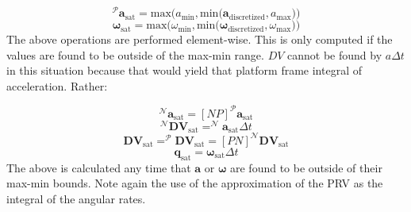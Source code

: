 \begin{equation}
	^\mathcal{P}\bm{a}_{\mathrm{sat}} = \mathrm{max}\big(a_{\mathrm{min}}, \mathrm{min}\big(    \bm{a}_{\mathrm{discretized}}, a_{\mathrm{max}}    \big)   \big)
\end{equation}
\begin{equation}
\bm{\omega}_{\mathrm{sat}} = \mathrm{max}\big(\omega_{\mathrm{min}}, \mathrm{min}\big(    \bm{\omega}_{\mathrm{discretized}}, \omega_{\mathrm{max}}    \big)   \big)
\end{equation}
The above operations are performed element-wise. This is only computed if the values are found to be outside of the max-min range. $DV$ cannot be found by $a\Delta t$ in this situation because that would yield that platform frame integral of acceleration. Rather:

\begin{equation}
	^\mathcal{N}\bm{a}_{\mathrm{sat}} = [NP] 	^\mathcal{P}\bm{a}_{\mathrm{sat}}
\end{equation}
\begin{equation}
	^\mathcal{N}\bm{DV}_{\mathrm{sat}} = ^\mathcal{N}\bm{a}_{\mathrm{sat}} \Delta t
\end{equation}
\begin{equation}
\bm{DV}_{\mathrm{sat}} = ^\mathcal{P}\bm{DV}_{\mathrm{sat}} = [PN]^\mathcal{N}\bm{DV}_{\mathrm{sat}} 
\end{equation}
\begin{equation}
\bm{q}_{\mathrm{sat}} = \bm{\omega}_{\mathrm{sat}}  \Delta t
\end{equation}
The above is calculated any time that $\bm{a}$ or $\bm{\omega}$ are found to be outside of their max-min bounds. Note again the use of the approximation of the PRV as the integral of the angular rates.

